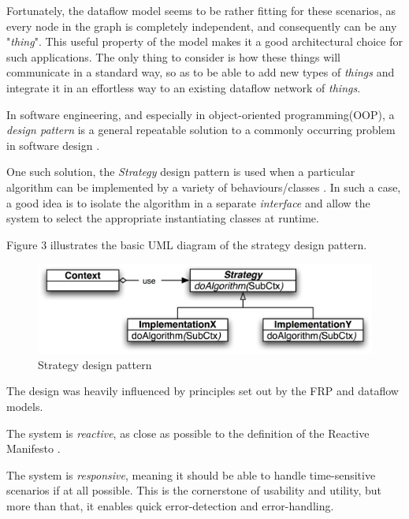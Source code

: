 \documentclass{dithesis}
\begin{document}
Fortunately, the dataflow model seems to be rather fitting for these scenarios, as every node in the graph is completely independent, and consequently can be any "\textit{thing}". This useful property of the model makes it a good architectural choice for such applications. The only thing to consider is how these things will communicate in a standard way, so as to be able to add new types of \textit{things} and integrate it in an effortless way to an existing dataflow network of \textit{things}.


In software engineering, and especially in object-oriented programming(OOP), a \textit{design pattern} is a general repeatable solution to a commonly occurring problem in software design \cite{design}.

One such solution, the \textit{Strategy} design pattern is used when a particular algorithm can be implemented by a variety of behaviours/classes \cite{design}. In such a case, a good idea is to isolate the algorithm in a separate \textit{interface} and allow the system to select the appropriate instantiating classes at runtime.

Figure 3 illustrates the basic UML diagram of the strategy design pattern.

\begin{figure}[h!] 
	\centering
	\includegraphics[scale=0.1]{strategy}
  	\caption{Strategy design pattern}
\end{figure}

The design was heavily influenced by principles set out by the FRP and dataflow models. 


The system is \textit{reactive}, as close as possible to the definition of the Reactive Manifesto \cite{manifesto}. 

The system is \textit{responsive}, meaning it should be able to handle time-sensitive scenarios if at all possible. This is the cornerstone of usability and utility, but more than that, it enables quick error-detection and error-handling.
\end{document}
